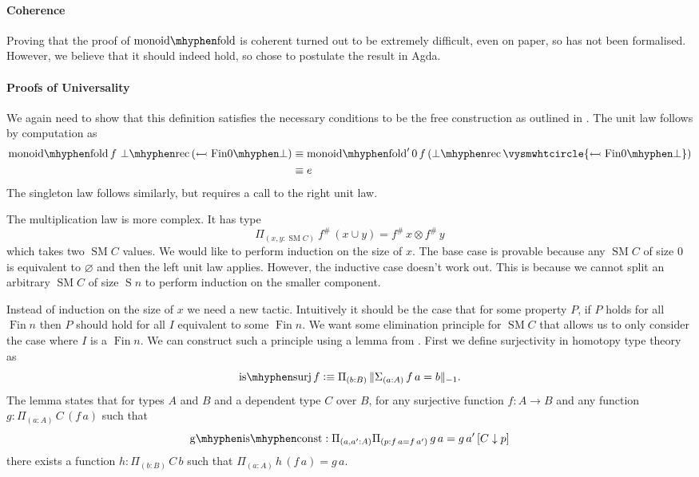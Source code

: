 \documentclass[12pt, parskip, DIV=14]{scrbook}
\newcommand{\defeq}{\vcentcolon\equiv}
\renewcommand{\circ}{\vysmwhtcircle}
\newcommand{\SM}{\operatorname{SM}}
\newcommand{\Fin}{\operatorname{Fin}}
\newcommand{\Suc}{\operatorname{S}}
\newcommand{\monfold}{\operatorname{monoid\mhyphen fold}}
\newcommand{\botrec}{\operatorname{\bot\mhyphen rec}}
\newcommand{\finempty}{\operatorname{Fin0\mhyphen\bot}}
\begin{document}
\paragraph{Coherence}

Proving that the proof of $\monfold$ is coherent turned out to be extremely difficult, even on paper, so has not been formalised. However, we believe that it should indeed hold, so chose to postulate the result in Agda.

\paragraph{Proofs of Universality} We again need to show that this definition satisfies the necessary conditions to be the free construction as outlined in . The unit law follows by computation as
\begin{align*}
  \monfold f\,\botrec\,(\leftarrowtail \finempty) &\equiv \monfold' 0\,f\,(\botrec \circ {\leftarrowtail \finempty}) \\
  &\equiv e
\end{align*}
The singleton law follows similarly, but requires a call to the right unit law.

The multiplication law is more complex. It has type
$$\Pi_{(x , y : \SM C)}~f^\#\,(x \cup y) = f^\#\,x \otimes f^\#\,y$$
which takes two $\SM C$ values. We would like to perform induction on the size of $x$. The base case is provable because any $\SM C$ of size $0$ is equivalent to $\varnothing$ and then the left unit law applies. However, the inductive case doesn't work out. This is because we cannot split an arbitrary $\SM C$ of size $\Suc n$ to perform induction on the smaller component.

Instead of induction on the size of $x$ we need a new tactic. Intuitively it should be the case that for some property $P$, if $P$ holds for all $\Fin n$ then $P$ should hold for all $I$ equivalent to some $\Fin n$. We want some elimination principle for $\SM C$ that allows us to only consider the case where $I$ is a $\Fin n$. We can construct such a principle using a lemma from \citep{hou2017higher}. First we define surjectivity in homotopy type theory as
$$\mathrm{is\mhyphen surj}\,f \defeq \Pi_{(b : B)}\,\| \Sigma_{(a : A)}\,f\,a = b \|_{-1}.$$
The lemma states that for types $A$ and $B$ and a dependent type $C$ over $B$, for any surjective function $f : A \to B$ and any function $g : \Pi_{(a : A)}\,C\,(f\,a)$ such that
$$\mathrm{g\mhyphen is\mhyphen const} : \Pi_{(a , a' : A)}\Pi_{(p : f\,a = f\,a')}\,g\,a = g\,a'\,[C \downarrow p]$$
there exists a function $h : \Pi_{(b : B)}\,C\,b$ such that $\Pi_{(a : A)}\,h\,(f\,a) = g\,a$.
\end{document}
